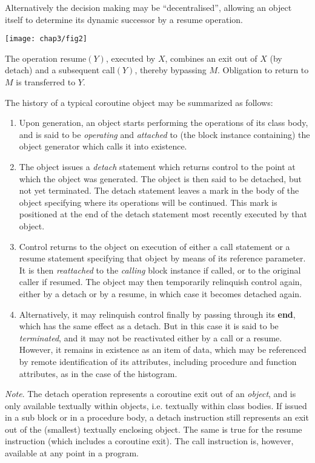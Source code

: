 \noindent
Alternatively the decision making may be ``decentralised'', allowing an object itself to determine its dynamic successor by a resume operation.

\begin{center}
	\texttt{[image: chap3/fig2]}
\end{center}

\noindent
The operation resume$(Y)$, executed by $X$, combines an exit out of $X$ (by detach) and a subsequent call$(Y)$, thereby bypassing $M$. Obligation to return to $M$ is transferred to $Y$.

The history of a typical coroutine object may be summarized as follows:

\begin{enumerate}[wide, nosep, label=(\arabic*)]
	\item Upon generation, an object starts performing the operations of its class body, and is said to be \textit{operating} and \textit{attached} to (the block instance containing) the object generator which calls it into existence.
	\item The object issues a \textit{detach} statement which returns control to the point at which the object was generated. The object is then said to be detached, but not yet terminated. The detach statement leaves a mark in the body of the object specifying where its operations will be continued. This mark is positioned at the end of the detach statement most recently executed by that object.
	\item Control returns to the object on execution of either a call statement or a resume statement specifying that object by means of its reference parameter. It is then \textit{reattached} to the \textit{calling} block instance if called, or to the original caller if resumed. The object may then temporarily relinquish control again, either by a detach or by a resume, in which case it becomes detached again. 
	\item Alternatively, it may relinquish control finally by passing through its \textbf{end}, which has the same effect as a detach. But in this case it is said to be \textit{terminated}, and it may not be reactivated either by a call or a resume. However, it remains in existence as an item of data, which may be referenced by remote identification of its attributes, including procedure and function attributes, as in the case of the histogram.
\end{enumerate}

\textit{Note}. The detach operation represents a coroutine exit out of an \textit{object}, and is only available textually within objects, i.e. textually within class bodies. If issued in a sub block or in a procedure body, a detach instruction still represents an exit out of the (smallest) textually enclosing object. The same
is true for the resume instruction (which includes a coroutine exit). The call instruction is, however, available at any point in a program.

